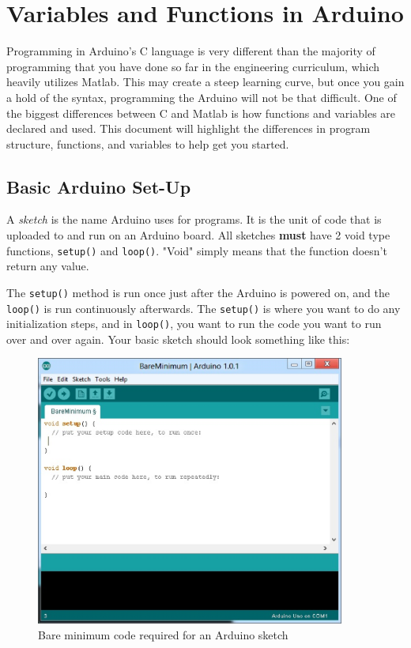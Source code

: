 



\section*{Variables and Functions in Arduino}

Programming in Arduino's C language is very different than the majority of programming that you have done so far in the engineering curriculum, which heavily utilizes Matlab. This may create a steep learning curve, but once you gain a hold of the syntax, programming the Arduino will not be that difficult. One of the biggest differences between C and Matlab is how functions and variables are declared and used. 
This document will highlight the differences in program structure, functions, and variables to help get you started.

\subsection*{Basic Arduino Set-Up}
A \textit{sketch} is the name Arduino uses for programs.  It is the unit of code that is uploaded to and run on an Arduino board.  All sketches \textbf{must} have 2 void type functions, \texttt{setup()} and \texttt{loop()}. "Void" simply means that the function doesn't return any value. 
\par The \texttt{setup()} method is run once just after the Arduino is powered on, and the \texttt{loop()} is run continuously afterwards.  The \texttt{setup()} is where you want to do any initialization steps, and in \texttt{loop()}, you want to run the code you want to run over and over again.  Your basic sketch should look something like this:

\begin{figure}[h]
\centering
\includegraphics[width=4in]{pics/arduino_bareminimum.eps}
\caption{Bare minimum code required for an Arduino sketch}
\label{fig:arduino_bareminimum}
\end {figure}

